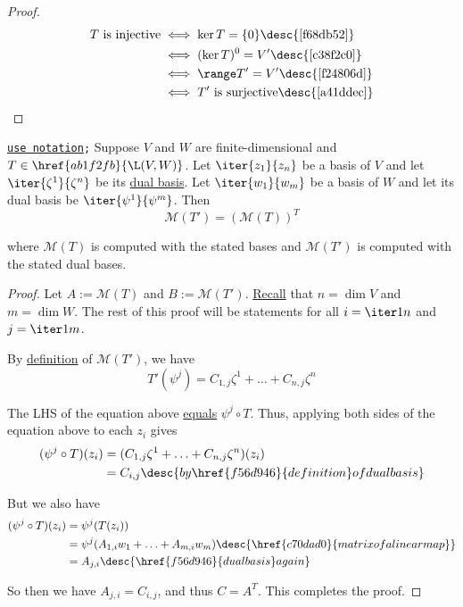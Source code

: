 \begin{proof}
  \begin{align*}
    T\text{ is injective} &\iff\ker T=\{0\}\desc{\autoref{f68db52}}             \\
                          &\iff(\ker T)^0=V'\desc{\autoref{c38f2c0}}            \\
                          &\iff\range T'=V'\desc{\autoref{f24806d}}             \\
                          &\iff T'\text{ is surjective}\desc{\autoref{a41ddec}}
  \end{align*}
\end{proof}

\label{d5cb407}

\texttt{\href{beaa574}{use notation};} Suppose $V$ and $W$ are
finite-dimensional and $T\in\href{ab1f2fb}{\L(V,W)}$. Let $\iter{z_1}{z_n}$ be a
basis of $V$ and let $\iter{\zeta^1}{\zeta^n}$ be its \href{f56d946}{dual
basis}. Let $\iter{w_1}{w_m}$ be a basis of $W$ and let its dual basis be
$\iter{\psi^1}{\psi^m}$.
Then
$$
  \mathcal M(T')=(\mathcal M(T))^T
$$

where $\mathcal M(T)$ is computed with the stated bases and $\mathcal M(T')$ is
computed with the stated dual bases.

\begin{proof}
  Let $A:=\mathcal M(T)$ and $B:=\mathcal M(T')$. \href{cd4284b}{Recall} that
  $n=\dim V$ and $m=\dim W$. The rest of this proof will be statements for all
  $i=\iter1n$ and $j=\iter1m$.

  By \href{c70dad0}{definition} of $\mathcal M(T')$, we have
  $$
    T'(\psi^j)=C_{1,j}\zeta^1+\ldots+C_{n,j}\zeta^n
  $$

  The LHS of the equation above \href{d80860c}{equals} $\psi^j\circ T$. Thus,
  applying both sides of the equation above to each $z_i$ gives
  \begin{align*}
    (\psi^j\circ T)(z_i) &=(C_{1,j}\zeta^1+\ldots+C_{n,j}\zeta^n)(z_i)               \\
                         &=C_{i,j}\desc{by \href{f56d946}{definition} of dual basis}
  \end{align*}

  But we also have
  \begin{align*}
    (\psi^j\circ T)(z_i) &=\psi^j(T(z_i))                                                                    \\
                         &=\psi^j(A_{1,i}w_1+\ldots+A_{m,i}w_m)\desc{\href{c70dad0}{matrix of a linear map}} \\
                         &=A_{j,i}\desc{\href{f56d946}{dual basis} again}
  \end{align*}

  So then we have $A_{j,i}=C_{i,j}$, and thus $C=A^T$. This completes the
  proof.
\end{proof}
